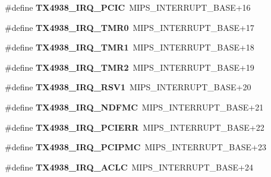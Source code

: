 \begin{DoxyCompactItemize}
\#define {\bfseries T\+X4938\+\_\+\+I\+R\+Q\+\_\+\+P\+C\+IC}~M\+I\+P\+S\+\_\+\+I\+N\+T\+E\+R\+R\+U\+P\+T\+\_\+\+B\+A\+SE+16
\item 
\mbox{\label{group__bsp__interrupt_ga5512d3b5b53ae14c4ec6c2d9793d441e}} 
\#define {\bfseries T\+X4938\+\_\+\+I\+R\+Q\+\_\+\+T\+M\+R0}~M\+I\+P\+S\+\_\+\+I\+N\+T\+E\+R\+R\+U\+P\+T\+\_\+\+B\+A\+SE+17
\item 
\mbox{\label{group__bsp__interrupt_gaf3a91f9886d009d2f2c76b558572747b}} 
\#define {\bfseries T\+X4938\+\_\+\+I\+R\+Q\+\_\+\+T\+M\+R1}~M\+I\+P\+S\+\_\+\+I\+N\+T\+E\+R\+R\+U\+P\+T\+\_\+\+B\+A\+SE+18
\item 
\mbox{\label{group__bsp__interrupt_ga0a71804b510ecd498220807bce5c7e77}} 
\#define {\bfseries T\+X4938\+\_\+\+I\+R\+Q\+\_\+\+T\+M\+R2}~M\+I\+P\+S\+\_\+\+I\+N\+T\+E\+R\+R\+U\+P\+T\+\_\+\+B\+A\+SE+19
\item 
\mbox{\label{group__bsp__interrupt_gab8838be07496c8c8ec99bc0687bd8141}} 
\#define {\bfseries T\+X4938\+\_\+\+I\+R\+Q\+\_\+\+R\+S\+V1}~M\+I\+P\+S\+\_\+\+I\+N\+T\+E\+R\+R\+U\+P\+T\+\_\+\+B\+A\+SE+20
\item 
\mbox{\label{group__bsp__interrupt_ga09a24a435193effe6034b1b1229a4f38}} 
\#define {\bfseries T\+X4938\+\_\+\+I\+R\+Q\+\_\+\+N\+D\+F\+MC}~M\+I\+P\+S\+\_\+\+I\+N\+T\+E\+R\+R\+U\+P\+T\+\_\+\+B\+A\+SE+21
\item 
\mbox{\label{group__bsp__interrupt_gafab0f8680056127c65e2fcddfd2079db}} 
\#define {\bfseries T\+X4938\+\_\+\+I\+R\+Q\+\_\+\+P\+C\+I\+E\+RR}~M\+I\+P\+S\+\_\+\+I\+N\+T\+E\+R\+R\+U\+P\+T\+\_\+\+B\+A\+SE+22
\item 
\mbox{\label{group__bsp__interrupt_ga99bfac75b4803787a8f8ac2b1ed1a83e}} 
\#define {\bfseries T\+X4938\+\_\+\+I\+R\+Q\+\_\+\+P\+C\+I\+P\+MC}~M\+I\+P\+S\+\_\+\+I\+N\+T\+E\+R\+R\+U\+P\+T\+\_\+\+B\+A\+SE+23
\item 
\mbox{\label{group__bsp__interrupt_ga337744a5ac5294381a323ff445bccbe7}} 
\#define {\bfseries T\+X4938\+\_\+\+I\+R\+Q\+\_\+\+A\+C\+LC}~M\+I\+P\+S\+\_\+\+I\+N\+T\+E\+R\+R\+U\+P\+T\+\_\+\+B\+A\+SE+24

\end{DoxyCompactItemize}
